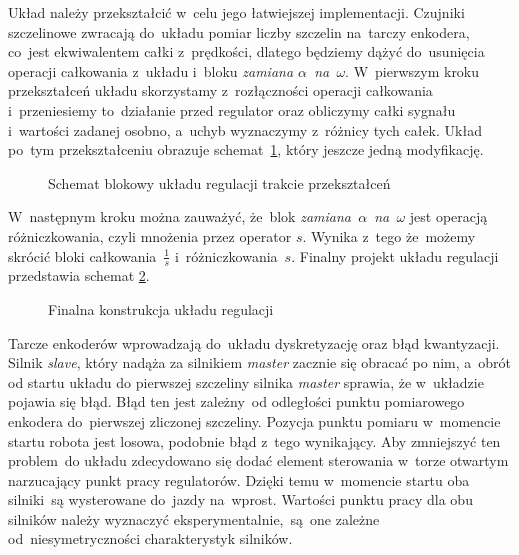 \documentclass[11pt]{article}
\begin{document}
Układ należy przekształcić w~celu jego łatwiejszej implementacji.
Czujniki szczelinowe zwracają do~układu pomiar liczby szczelin na~tarczy enkodera, co~jest ekwiwalentem całki z~prędkości, dlatego będziemy dążyć do~usunięcia operacji całkowania z~układu i~bloku \textit{zamiana $ \alpha $~na~$ \omega  $}.
W~pierwszym kroku przekształceń układu skorzystamy z~rozłączności operacji całkowania i~przeniesiemy to~działanie przed regulator oraz obliczymy całki sygnału i~wartości zadanej osobno, a~uchyb wyznaczymy z~różnicy tych całek.
Układ po~tym przekształceniu obrazuje schemat~\ref{fig:tikz:control_block_2}, który jeszcze jedną modyfikację.
\begin{figure}[htbp]
	\centering
	
	\caption{Schemat blokowy układu regulacji trakcie przekształceń}
	\label{fig:tikz:control_block_2}
\end{figure}
W~następnym kroku można zauważyć, że~blok \textit{zamiana~$ \alpha $~na~$ \omega $} jest operacją różniczkowania, czyli mnożenia przez operator $ s $. Wynika z~tego że~możemy skrócić bloki całkowania~$ \frac{1}{s} $ i~różniczkowania~$ s $.
Finalny projekt układu regulacji przedstawia schemat \ref{fig:tikz:control_block_3}.
\begin{figure}
	\centering
	
	\caption{Finalna konstrukcja układu regulacji}
	\label{fig:tikz:control_block_3}
\end{figure}
Tarcze enkoderów wprowadzają do~układu dyskretyzację oraz błąd kwantyzacji.
Silnik \textit{slave}, który nadąża za silnikiem \textit{master} zacznie się obracać po nim, a~obrót od startu układu do pierwszej szczeliny silnika \textit{master} sprawia, że w~układzie pojawia się błąd.
Błąd ten jest zależny~od odległości punktu pomiarowego enkodera do~pierwszej zliczonej szczeliny.
Pozycja punktu pomiaru w~momencie startu robota jest losowa, podobnie błąd z~tego wynikający.
Aby zmniejszyć ten problem~do układu zdecydowano się dodać element sterowania w~torze otwartym narzucający punkt pracy regulatorów.
Dzięki temu w~momencie startu oba silniki~są wysterowane do~jazdy na~wprost.
Wartości punktu pracy dla obu silników należy wyznaczyć eksperymentalnie,~są~one zależne od~niesymetryczności charakterystyk silników.
\end{document}
